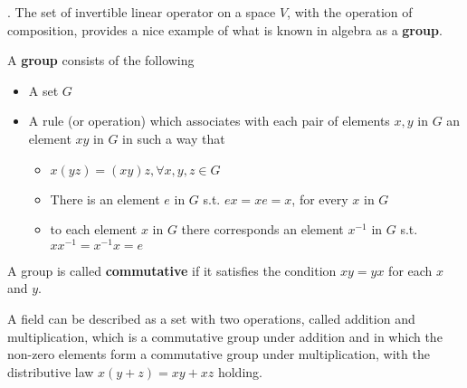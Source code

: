 \documentclass[8pt]{beamer}
\newcommand{\tb}[1]{\textbf{#1}}
\begin{document}
\begin{frame}{.}
    The set of invertible linear operator on a space $V$, with the operation of composition, provides a nice example of what is known in algebra as a \tb{group}.

    \begin{definition}
        A \tb{group} consists of the following
        \begin{itemize}
            \item A set $G$
            \item A rule (or operation) which associates with each pair of elements $x, y$ in $G$ an element $xy$ in $G$ in such a way that
            \begin{itemize}
                \item $x(yz) = (xy)z, \forall x,y,z \in G$
                \item There is an element $e$ in $G$ s.t. $ex=xe=x$, for every $x$ in $G$
                \item to each element $x$ in $G$ there corresponds an element $x^{-1}$ in $G$ s.t. $x x^{-1} = x^{-1}x = e$
            \end{itemize}
        \end{itemize}

        A group is called \tb{commutative} if it satisfies the condition $xy = yx$ for each $x$ and $y$.
    \end{definition}

    A field can be described as a set with two operations, called addition and multiplication, which is a commutative group under addition and in which the non-zero elements form a commutative group under multiplication, with the distributive law $x(y+z) = xy + xz$ holding.
\end{frame}
\end{document}
